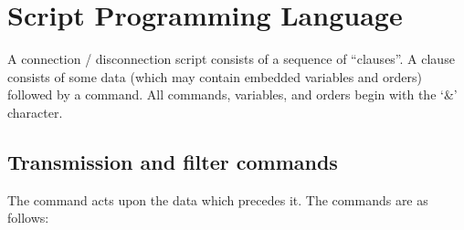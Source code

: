 \documentclass[letterpaper,10pt,english]{sphinxmanual}
\begin{document}
\ignorespaces 

\section{Script Programming Language}
\label{\detokenize{connectivity_guide:script-programming-language}}\label{\detokenize{connectivity_guide:index-117}}
\sphinxAtStartPar
A connection / disconnection script consists of a sequence of “clauses”. A clause consists of some data (which may contain embedded variables and orders) followed by a command. All commands, variables, and orders begin with the ‘\&’ character.

\ignorespaces 

\subsection{Transmission and filter commands}
\label{\detokenize{connectivity_guide:transmission-and-filter-commands}}\label{\detokenize{connectivity_guide:index-118}}
\sphinxAtStartPar
The command acts upon the data which precedes it. The commands are as follows:\sphinxhyphen{}
\end{document}
